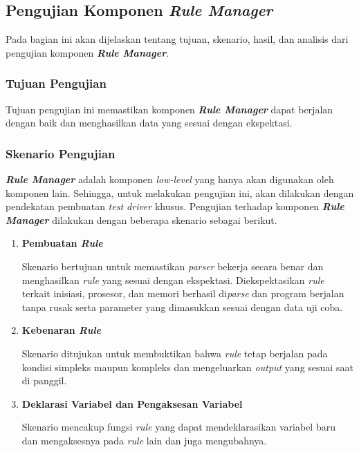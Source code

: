 \subsection{Pengujian Komponen \textit{Rule Manager}}

Pada bagian ini akan dijelaskan tentang tujuan, skenario, hasil, dan analisis dari pengujian komponen \textbf{\textit{Rule Manager}}.

\subsubsection{Tujuan Pengujian}

Tujuan pengujian ini memastikan komponen \textbf{\textit{Rule Manager}} dapat berjalan dengan baik dan menghasilkan data yang sesuai dengan ekspektasi.

\subsubsection{Skenario Pengujian}

\textbf{\textit{Rule Manager}} adalah komponen \textit{low-level} yang hanya akan digunakan oleh komponen lain. Sehingga, untuk melakukan pengujian ini, akan dilakukan dengan pendekatan pembuatan \textit{test driver} khusus. Pengujian terhadap komponen \textbf{\textit{Rule Manager}} dilakukan dengan beberapa skenario sebagai berikut.
\begin{enumerate}
  \item \bfseries Pembuatan \textit{Rule}\normalfont

        Skenario bertujuan untuk memastikan \textit{parser} bekerja secara benar dan menghasilkan \textit{rule} yang sesuai dengan ekspektasi. Diekspektasikan \textit{rule} terkait inisiasi, prosesor, dan memori berhasil di\textit{parse} dan program berjalan tanpa rusak serta parameter yang dimasukkan sesuai dengan data uji coba.

  \item \bfseries Kebenaran \textit{Rule}\normalfont

        Skenario ditujukan untuk membuktikan bahwa \textit{rule} tetap berjalan pada kondisi simpleks maupun kompleks dan mengeluarkan \textit{output} yang sesuai saat di panggil.

  \item \bfseries Deklarasi Variabel dan Pengaksesan Variabel\normalfont

        Skenario mencakup fungsi \textit{rule} yang dapat mendeklarasikan variabel baru dan mengaksesnya pada \textit{rule} lain dan juga mengubahnya.
\end{enumerate}

